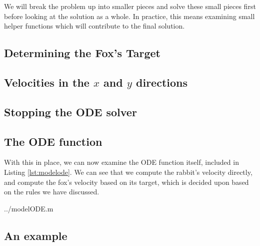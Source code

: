 We will break the problem up into smaller pieces and solve these small pieces first before looking at the solution as a whole. In practice, this means examining small helper functions which will contribute to the final solution.

\subsection {Determining the Fox's Target} \label{lbl:foxtarget}



\subsection {Velocities in the $x$ and $y$ directions}



\subsection {Stopping the ODE solver}



\subsection{The ODE function}

With this in place, we can now examine the ODE function itself, included in Listing \ref{lst:modelode}. We can see that we compute the rabbit's velocity directly, and compute the fox's velocity based on its target, which is decided upon based on the rules we have discussed.

  {../modelODE.m}
 
 \subsection{An example}\label{sec:example}
 
 